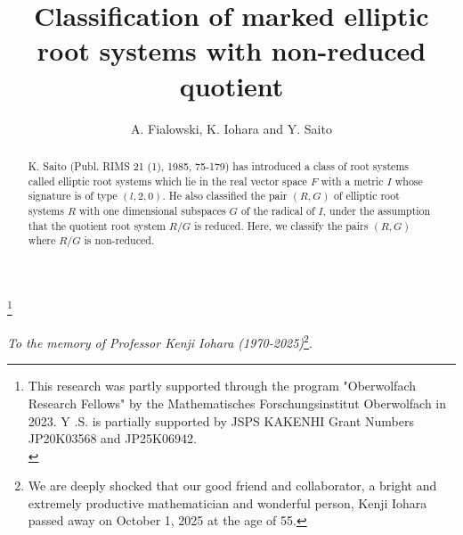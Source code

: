 \documentclass[11pt]{amsart}
\begin{document}
\title[Classification of mERS with non-reduced quotient]
{Classification of marked elliptic root systems with non-reduced quotient}
\author{A. Fialowski, K. Iohara and Y. Saito}
\address{Alice Fialowski, Department Computer Algebra, 
E\"{o}tv\"{o}s Lor\'{a}nd University, H-1117 Budapest, 
P\'{a}zm\'{a}ny P\'{e}ter s\'{e}t\'{a}ny 1/C, Budapest, Hungary}
\address{Kenji Iohara, Universit\'{e} Claude Bernard Lyon 1, CNRS, Institut Camille Jordan UMR 5208, F-69622 Villeurbanne, France}
\address{Yoshihisa Saito, Department of Mathematics, Rikkyo University, Toshima-ku, Tokyo 171-8501, Japan}

\thanks{This research was partly supported through the program "Oberwolfach Research Fellows"  by the Mathematisches Forschungsinstitut Oberwolfach in 2023.   Y .S. is partially supported by JSPS KAKENHI Grant Numbers JP20K03568 and JP25K06942.\\}


\begin{abstract} K. Saito (Publ. RIMS 21 (1), 1985, 75-179) has introduced a class of root systems called elliptic root systems which lie in the real vector space $F$ with a metric $I$ whose signature is of type $(l,2,0)$. He also classified the pair $(R,G)$ of  elliptic root systems $R$ with one dimensional subspaces $G$ of the radical of $I$, under the assumption that the quotient root system $R/G$ is reduced. Here, we classify the pairs $(R,G)$ where $R/G$ is non-reduced. 
\end{abstract}


\maketitle

\begin{center}
{\it To the memory of  Professor Kenji Iohara {\rm(}1970-2025{\rm)}}\footnote{We are 
deeply shocked that our good friend and collaborator, a bright and extremely productive 
mathematician and wonderful person, Kenji Iohara passed away on October 1, 2025 
at the age of 55.}.
\end{center}
\vskip 0.3in

\setcounter{tocdepth}{2}
\tableofcontents


\end{document}
